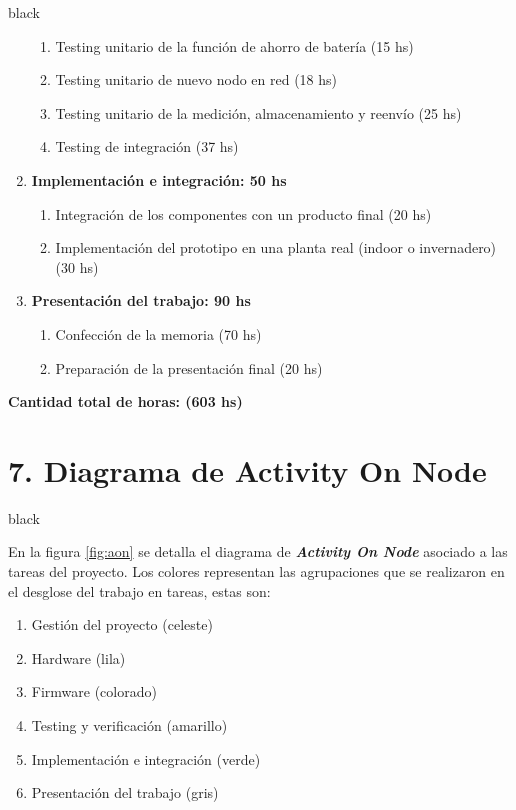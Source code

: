 \documentclass[11pt]{charter}
\begin{document}
\begin{consigna}{black}
\begin{enumerate}
\begin{enumerate}
	\item Testing unitario de la función de ahorro de batería (15 hs)
	\item Testing unitario de nuevo nodo en red (18 hs)
	\item Testing unitario de la medición, almacenamiento y reenvío (25 hs)
	\item Testing de integración (37 hs)
	\end{enumerate}
\item \textbf{Implementación e integración: 50 hs}
	\begin{enumerate}
	\item Integración de los componentes con un producto final (20 hs)
	\item Implementación del prototipo en una planta real (indoor o invernadero) (30 hs)
	\end{enumerate}
\item \textbf{Presentación del trabajo: 90 hs}
	\begin{enumerate}
	\item Confección de la memoria (70 hs)
	\item Preparación de la presentación final (20 hs)
	\end{enumerate}
\end{enumerate}

\textbf{Cantidad total de horas: (603 hs)}


\end{consigna}

\section{7. Diagrama de Activity On Node}
\label{sec:AoN}

\begin{consigna}{black}

En la figura \ref{fig:aon} se detalla el diagrama de \textbf{\textit{Activity On Node}} {} asociado a las tareas del proyecto. Los colores representan las agrupaciones que se realizaron en el desglose del trabajo en tareas, estas son:

\begin{enumerate}
	\item Gestión del proyecto (celeste)
	\item Hardware (lila)
	\item Firmware (colorado)
	\item Testing y verificación (amarillo)
	\item Implementación e integración (verde)
	\item Presentación del trabajo (gris)
\end{enumerate}



\end{consigna}
\end{document}
